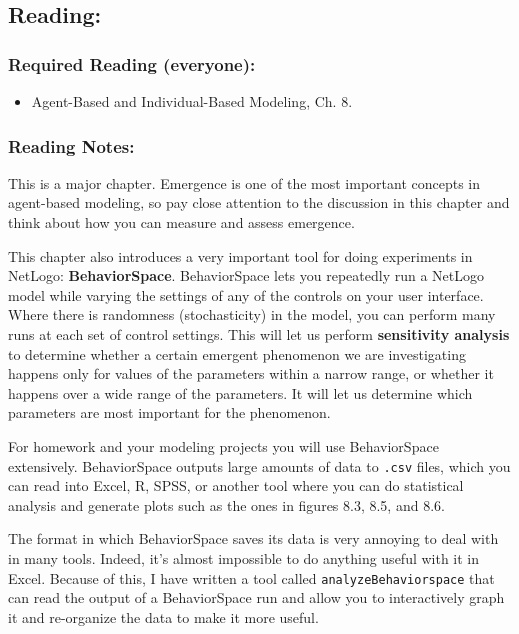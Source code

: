 \documentclass[
]{article}
\providecommand{\tightlist}{%
  \setlength{\itemsep}{0pt}\setlength{\parskip}{0pt}}
\begin{document}
\hypertarget{reading-8}{%
\subsection{Reading:}\label{reading-8}}

\hypertarget{required-reading-everyone-7}{%
\subsubsection{Required Reading
(everyone):}\label{required-reading-everyone-7}}

\begin{itemize}
\tightlist
\item
  Agent-Based and Individual-Based Modeling, Ch. 8.
\end{itemize}

\hypertarget{reading-notes-7}{%
\subsubsection{Reading Notes:}\label{reading-notes-7}}

This is a major chapter. Emergence is one of the most important concepts
in agent-based modeling, so pay close attention to the discussion in
this chapter and think about how you can measure and assess emergence.

This chapter also introduces a very important tool for doing experiments
in NetLogo: \textbf{BehaviorSpace}. BehaviorSpace lets you repeatedly
run a NetLogo model while varying the settings of any of the controls on
your user interface. Where there is randomness (stochasticity) in the
model, you can perform many runs at each set of control settings. This
will let us perform \textbf{sensitivity analysis} to determine whether a
certain emergent phenomenon we are investigating happens only for values
of the parameters within a narrow range, or whether it happens over a
wide range of the parameters. It will let us determine which parameters
are most important for the phenomenon.

For homework and your modeling projects you will use BehaviorSpace
extensively. BehaviorSpace outputs large amounts of data to
\texttt{.csv} files, which you can read into Excel, R, SPSS, or another
tool where you can do statistical analysis and generate plots such as
the ones in figures 8.3, 8.5, and 8.6.

The format in which BehaviorSpace saves its data is very annoying to
deal with in many tools. Indeed, it's almost impossible to do anything
useful with it in Excel. Because of this, I have written a tool called
\texttt{analyzeBehaviorspace} that can read the output of a
BehaviorSpace run and allow you to interactively graph it and
re-organize the data to make it more useful.
\end{document}
